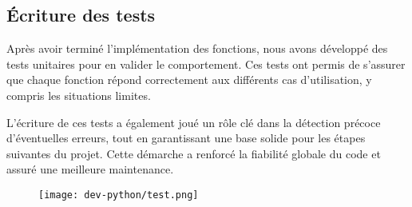 \subsection{Écriture des tests}

Après avoir terminé l'implémentation des fonctions, nous avons développé des tests unitaires pour en valider le comportement. Ces tests ont permis de s’assurer que chaque fonction répond correctement aux différents cas d’utilisation, y compris les situations limites.

L’écriture de ces tests a également joué un rôle clé dans la détection précoce d’éventuelles erreurs, tout en garantissant une base solide pour les étapes suivantes du projet. Cette démarche a renforcé la fiabilité globale du code et assuré une meilleure maintenance.

\begin{figure}[h]
    \centering
    \texttt{[image: dev-python/test.png]}
\end{figure}

\vspace{-0.6cm}